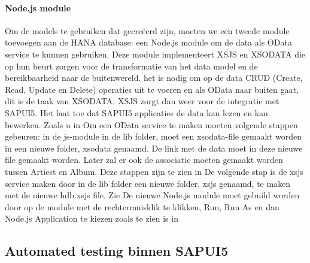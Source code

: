             \paragraph{Node.js module}
            Om de models te gebruiken dat gecreëerd zijn, moeten we een tweede module toevoegen aan de HANA database: een Node.js module om de data als OData service te kunnen gebruiken.
            Deze module implementeert XSJS en XSODATA die op hun beurt zorgen voor de transformatie van het data model en de bereikbaarheid naar de buitenwereld. het is nodig om op de data CRUD (Create, Read, Update en Delete) operaties uit te voeren en als OData naar buiten gaat, dit is de taak van XSODATA. XSJS zorgt dan weer voor de integratie met SAPUI5. Het laat toe dat SAPUI5 applicaties de data kan lezen en kan bewerken.
            Zoals u in %
            Om een OData service te maken moeten volgende stappen gebeuren: in de js-module in de lib folder, moet een xsodata-file gemaakt worden in een nieuwe folder, xsodata genaamd. De link met de data moet in deze nieuwe file gemaakt worden. Later zal er ook de associatie moeten gemaakt worden tussen Artiest en Album. Deze stappen zijn te zien in %
            De volgende stap is de xsjs service maken door in de lib folder een nieuwe folder, xsjs genaamd, te maken met de nieuwe hdb.xsjs file. Zie %
            De nieuwe Node.js module moet gebuild worden door op de module met de rechtermuisklik te klikken, Run, Run As en dan Node.js Application te kiezen zoals te zien is in %
            
        \subsection{Automated testing binnen SAPUI5}
        \label{subsec:automated-testing-SAPUI5}
